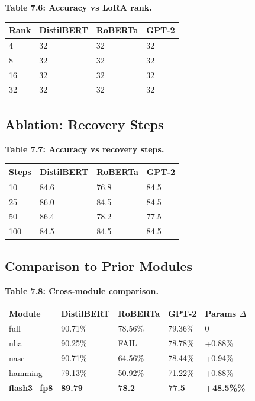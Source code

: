 \textbf{Table 7.6: Accuracy vs LoRA rank.}

\begin{table}[H]
\centering
\small
\begin{tabular}{llll}
\toprule
\textbf{Rank} & \textbf{DistilBERT} & \textbf{RoBERTa} & \textbf{GPT-2} \\
\midrule
4 & 32 & 32 & 32 \\
8 & 32 & 32 & 32 \\
16 & 32 & 32 & 32 \\
32 & 32 & 32 & 32 \\
\bottomrule
\end{tabular}
\end{table}

\subsection{Ablation: Recovery Steps}

\textbf{Table 7.7: Accuracy vs recovery steps.}

\begin{table}[H]
\centering
\small
\begin{tabular}{llll}
\toprule
\textbf{Steps} & \textbf{DistilBERT} & \textbf{RoBERTa} & \textbf{GPT-2} \\
\midrule
10 & 84.6 & 76.8 & 84.5 \\
25 & 86.0 & 84.5 & 84.5 \\
50 & 86.4 & 78.2 & 77.5 \\
100 & 84.5 & 84.5 & 84.5 \\
\bottomrule
\end{tabular}
\end{table}

\subsection{Comparison to Prior Modules}

\textbf{Table 7.8: Cross-module comparison.}

\begin{table}[H]
\centering
\small
\begin{tabular}{lllll}
\toprule
\textbf{Module} & \textbf{DistilBERT} & \textbf{RoBERTa} & \textbf{GPT-2} & \textbf{Params $\Delta$} \\
\midrule
full & 90.71\% & 78.56\% & 79.36\% & 0 \\
nha & 90.25\% & FAIL & 78.78\% & +0.88\% \\
nasc & 90.71\% & 64.56\% & 78.44\% & +0.94\% \\
hamming & 79.13\% & 50.92\% & 71.22\% & +0.88\% \\
\textbf{flash3\_fp8} & \textbf{89.79} & \textbf{78.2} & \textbf{77.5} & \textbf{+48.5\%\%} \\
\bottomrule
\end{tabular}
\end{table}

